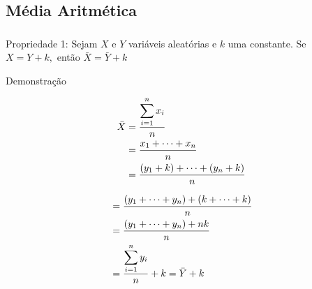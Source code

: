 \documentclass[14pt,aspectratio=1610]{beamer}
\begin{document}
\subsection{Média Aritmética}
\begin{frame}{}
	\small
\frametitle{}
\begin{block}{Propriedade 1:}
\justifying
Sejam $X$ e $Y$ variáveis aleatórias e $k$ uma constante. Se $X=Y+k,$ então $\bar{X}=\bar{Y}+k$
\end{block}
\pause
\begin{block}{Demonstração}
\begin{minipage}{0.4\textwidth}
\begin{align*}
\bar{X}&=\dfrac{{\displaystyle \sum_{i=1}^{n}x_{i}}}{n}\\ 
\vspace{0.1cm}
       &=\dfrac{x_{1}+\cdots+x_{n}}{n}\\ \vspace{0.1cm}
       &=\dfrac{(y_{1}+k)+\cdots+(y_{n}+k)}{n}\\
\end{align*}
\end{minipage}\pause\hfill
\begin{minipage}{0.4\textwidth}
\begin{align*}
&=\dfrac{(y_{1}+\cdots+y_{n})+
(k+\cdots+k)}{n}\\ \vspace{0.1cm}
&=\dfrac{(y_{1}+\cdots+y_{n})+
nk}{n}\\ \vspace{0.1cm}
&=\dfrac{{\displaystyle \sum_{i=1}^{n}y_{i}}}{n}+k=\bar{Y}+k
\end{align*}
\end{minipage}
\end{block}
\end{frame}
\end{document}
